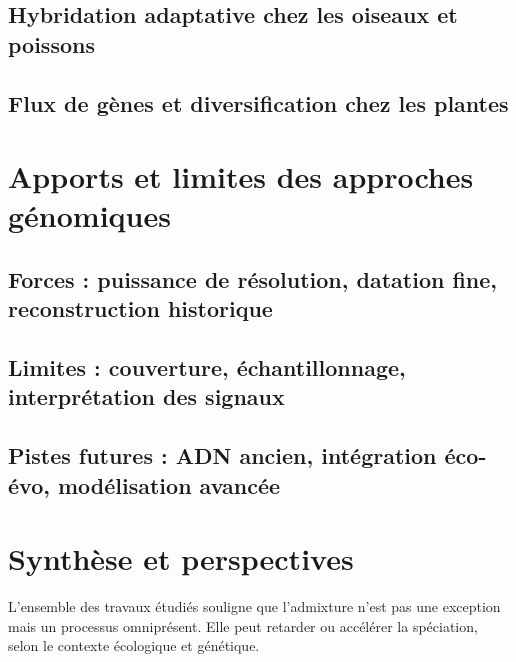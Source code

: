 \documentclass[12pt,a4paper]{article}
\begin{document}
\subsection{Hybridation adaptative chez les oiseaux et poissons}
\subsection{Flux de gènes et diversification chez les plantes}

\section{Apports et limites des approches génomiques}
\subsection{Forces : puissance de résolution, datation fine, reconstruction historique}
\subsection{Limites : couverture, échantillonnage, interprétation des signaux}
\subsection{Pistes futures : ADN ancien, intégration éco-évo, modélisation avancée}

\section{Synthèse et perspectives}
L’ensemble des travaux étudiés souligne que l’admixture n’est pas une exception mais un processus omniprésent.
Elle peut retarder ou accélérer la spéciation, selon le contexte écologique et génétique.

\printbibliography
\end{document}
